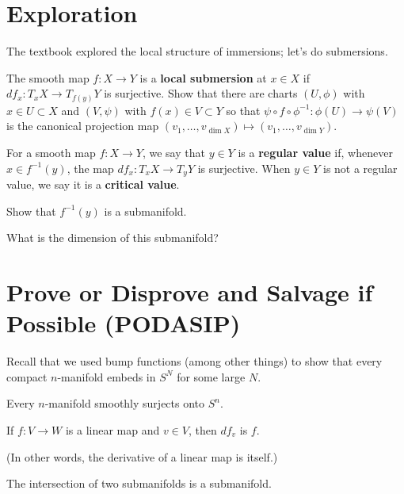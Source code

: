 \documentclass{homework}
\begin{document}
\section{Exploration}

\begin{problem}
  The textbook explored the local structure of immersions; let's do submersions.
  
  The smooth map $f : X \to Y$ is a \textbf{local submersion} at
  $x \in X$ if $df_x : T_x X \to T_{f(y)} Y$ is surjective.  Show that
  there are charts $(U,\phi)$ with $x \in U \subset X$ and $(V,\psi)$
  with $f(x) \in V \subset Y$ so that
  $\psi \circ f \circ \phi^{-1} : \phi(U) \to \psi(V)$ is the
  canonical projection map
  $(v_1,\ldots,v_{\dim X}) \mapsto (v_1,\ldots,v_{\dim Y})$.
\end{problem}

\begin{problem}
  For a smooth map $f : X \to Y$, we say that $y \in Y$ is a
  \textbf{regular value} if, whenever $x \in f^{-1}(y)$, the map
  $df_x : T_x X \to T_y Y$ is surjective.  When $y \in Y$ is not a
  regular value, we say it is a \textbf{critical value}.

  Show that $f^{-1}(y)$ is a submanifold.

  What is the dimension of this submanifold?
\end{problem}


\section{Prove or Disprove and Salvage if Possible (PODASIP)}

Recall that we used bump functions (among other things) to show that
every compact $n$-manifold embeds in $S^N$ for some large $N$.

\begin{problem}
  Every $n$-manifold smoothly surjects onto $S^n$.
\end{problem}

\begin{problem}
  If $f : V \to W$ is a linear map and $v \in V$, then $df_v$ is $f$.

  (In other words, the derivative of a linear map is itself.)
\end{problem}

\begin{problem}
  The intersection of two submanifolds is a submanifold.
\end{problem}
\end{document}
